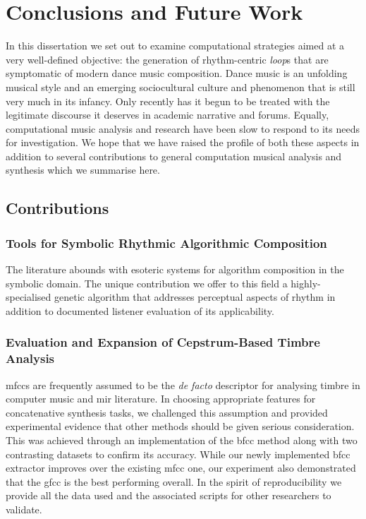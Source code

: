 \chapter{Conclusions and Future Work}
\label{chap:conclusions}

In this dissertation we set out to examine computational strategies aimed at a very well-defined objective: the generation of rhythm-centric \textit{loop}s that are symptomatic of modern dance music composition. Dance music is an unfolding musical style and an emerging sociocultural culture and phenomenon that is still very much in its infancy. Only recently has it begun to be treated with the legitimate discourse it deserves in academic narrative and forums. Equally, computational music analysis and research have been slow to respond to its needs for investigation. We hope that we have raised the profile of both these aspects in addition to several contributions to general computation musical analysis and synthesis which we summarise here.

\section{Contributions} 

\subsection{Tools for Symbolic Rhythmic Algorithmic Composition}

The literature abounds with esoteric systems for algorithm composition in the symbolic domain. The unique contribution we offer to this field a highly-specialised genetic algorithm that addresses perceptual aspects of rhythm in addition to documented listener evaluation of its applicability.

\subsection{Evaluation and Expansion of Cepstrum-Based Timbre Analysis}

\acrshort{mfcc}s are frequently assumed to be the \textit{de facto} descriptor for analysing timbre in computer music and \acrshort{mir} literature. In choosing appropriate features for concatenative synthesis tasks, we challenged this assumption and provided experimental evidence that other methods should be given serious consideration. This was achieved through an implementation of the \acrshort{bfcc} method along with two contrasting datasets to confirm its accuracy. While our newly implemented \acrshort{bfcc} extractor improves over the existing \acrshort{mfcc} one, our experiment also demonstrated that the \acrshort{gfcc} is the best performing overall. In the spirit of reproducibility we provide all the data used and the associated scripts for other researchers to validate.


